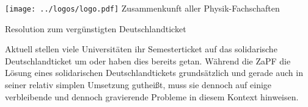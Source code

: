 \documentclass[DIV=calc]{scrartcl}
\begin{document}
\hspace{0.87\textwidth}
\begin{minipage}{120pt}
	\vspace{-1.8cm}
	\texttt{[image: ../logos/logo.pdf]}
	\centering
	\small Zusammenkunft aller Physik-Fachschaften
\end{minipage}

\begin{center}
  \huge{Resolution zum vergünstigten Deutschlandticket}\vspace{.25\baselineskip}\\
  \normalsize
\end{center}
\vspace{1cm}







Aktuell stellen viele Universitäten ihr Semesterticket auf das solidarische Deutschlandticket um oder haben dies bereits getan. Während die ZaPF die Lösung eines solidarischen Deutschlandtickets grundsätzlich und gerade auch in seiner relativ simplen Umsetzung gutheißt, muss sie dennoch auf einige verbleibende und dennoch gravierende Probleme in diesem Kontext hinweisen.
\end{document}
